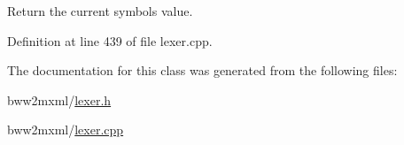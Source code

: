 Return the current symbols value. 

Definition at line 439 of file lexer.\+cpp.



The documentation for this class was generated from the following files\+:\begin{DoxyCompactItemize}
\item 
bww2mxml/\hyperlink{bww2mxml_2lexer_8h}{lexer.\+h}\item 
bww2mxml/\hyperlink{lexer_8cpp}{lexer.\+cpp}\end{DoxyCompactItemize}
